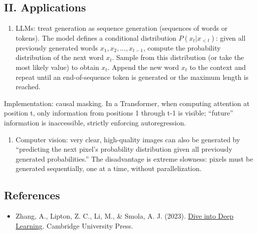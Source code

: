 \hypertarget{ii.-applications}{%
\subsection{II. Applications}\label{ii.-applications}}

\begin{enumerate}
\def\labelenumi{\arabic{enumi}.}
\tightlist
\item
  LLMs: treat generation as sequence generation (sequences of words or tokens). The model defines a conditional distribution \(P(x_t | x_{<t})\): given all previously generated words \(x_1, x_2, ..., x_{t-1}\), compute the probability distribution of the next word \(x_t\). Sample from this distribution (or take the most likely value) to obtain \(x_t\). Append the new word \(x_t\) to the context and repeat until an end-of-sequence token is generated or the maximum length is reached.
\end{enumerate}

Implementation: causal masking. In a Transformer, when computing attention at position t, only information from positions 1 through t-1 is visible; ``future'' information is inaccessible, strictly enforcing autoregression.

\begin{enumerate}
\def\labelenumi{\arabic{enumi}.}
\setcounter{enumi}{1}
\tightlist
\item
  Computer vision: very clear, high-quality images can also be generated by ``predicting the next pixel's probability distribution given all previously generated probabilities.'' The disadvantage is extreme slowness: pixels must be generated sequentially, one at a time, without parallelization.
\end{enumerate}

\FloatBarrier
{}
\hypertarget{references-17}{%
\subsection{References}\label{references-17}}

\vspace{0.25em}
\begin{itemize}
\tightlist
\item
  Zhang, A., Lipton, Z. C., Li, M., \& Smola, A. J. (2023). \href{https://D2L.ai}{Dive into Deep Learning}. Cambridge University Press.
\end{itemize}

\clearpage
